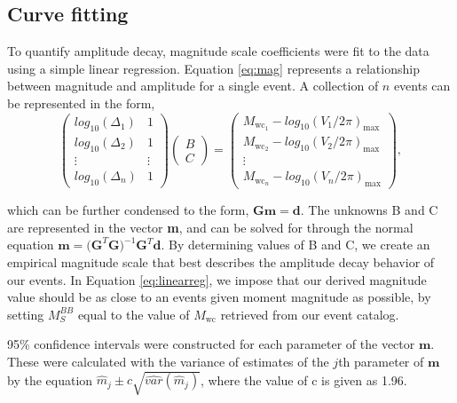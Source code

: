 \documentclass{gji}
\begin{document}
\subsection{Curve fitting}
To quantify amplitude decay, magnitude scale coefficients were fit to the data using a simple linear regression. Equation \ref{eq:mag} represents a relationship between magnitude and amplitude for a single event. A collection of $n$ events can be represented in the form, 
\begin{equation}
	\begin{pmatrix}
		log_{10}(\Delta_{1}) & 1 \\
		log_{10}(\Delta_{2}) & 1 \\
		\vdots  & \vdots \\
		log_{10}(\Delta_{n}) & 1 
	\end{pmatrix}
	\begin{pmatrix}
		{B}\\
		{C}
	\end{pmatrix}
	=
	\begin{pmatrix}
		M_{\text{wc}_1} - log_{10}({V_1}/{2\pi})_{\text{max}} \\
		M_{\text{wc}_2} - log_{10}({V_2}/{2\pi})_{\text{max}} \\
		\vdots  \\
		M_{\text{wc}_n} - log_{10}({V_n}/{2\pi})_{\text{max}}
	\end{pmatrix},
	\label{eq:linearreg}
\end{equation}

\noindent which can be further condensed to the form, $\mathbf{Gm = d}$. The unknowns B and C are represented in the vector {\bfseries m}, and can be solved for through the normal equation $\mathbf{m} = \mathbf{(G}^{T}\mathbf{G})^{-1}\mathbf{G}^T\mathbf{d}$.
By determining values of B and C, we create an empirical magnitude scale that best describes the amplitude decay behavior of our events. In Equation \ref{eq:linearreg}, we impose that our derived magnitude value should be as close to an events given moment magnitude as possible, by setting $M_S^{BB}$ equal to the value of $M_\text{wc}$ retrieved from our event catalog. 

95\% confidence intervals were constructed for each parameter of the vector $\mathbf{m}$. These were calculated with the variance of estimates of the $j$th parameter of $\mathbf{m}$ by the equation $\hat{m}_j \pm c \sqrt{\hat{var}(\hat{m}_j)}$, where the value of c is given as 1.96.
\end{document}
